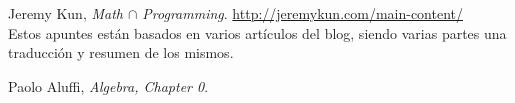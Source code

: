 \documentclass[paper=a4, fontsize=11pt, spanish]{scrartcl}
\numberwithin{equation}{section} %
\numberwithin{figure}{section} %
\numberwithin{table}{section} %
\begin{document}
  \vfill
  \begin{thebibliography}{9}

    Jeremy Kun,
    \emph{Math $\cap$ Programming}. \quad
    \url{http://jeremykun.com/main-content/} \\
    Estos apuntes están basados en varios artículos del blog, siendo 
    varias partes una traducción y resumen de los mismos.
    
    Paolo Aluffi,
    \emph{Algebra, Chapter 0}. \\
    
  \end{thebibliography}
\end{document}
